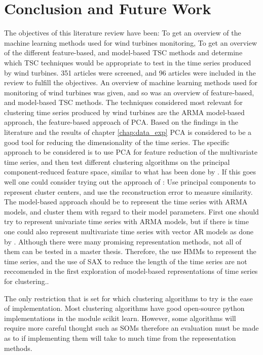 \chapter{Conclusion and Future Work}
The objectives of this literature review have been: To get an overview of the machine learning methods used for wind turbines monitoring, To get an overview of the different feature-based, and model-based TSC methods and determine which TSC techniques would be appropriate to test in the time series produced by wind turbines. 351 articles were screened, and 96 articles were included in the review to fulfill the objectives. An overview of machine learning methods used for monitoring of wind turbines was given, and so was an overview of feature-based, and model-based TSC methods. The techniques considered most relevant for clustering time series produced by wind turbines are the ARMA model-based approach, the feature-based approach of PCA. 
Based on the findings in the literature and the results of chapter \ref{chap:data_exp} 
PCA is considered to be a good tool for reducing the dimensionality of the time series. The specific approach to be considered is to use PCA for feature reduction of the multivariate time series, and then test different clustering algorithms on the principal component-reduced feature space, 
similar to what has been done by \textcite{fault_detect_PARAFAC_k_means}. 
If this goes well one could consider trying out the approach of \textcite{multivariate_tsc_common_pca}: Use principal components to represent cluster centers, and use the reconstruction error to measure similarity.
The model-based approach should be to represent the time series with ARMA models, and cluster them with regard to their model parameters. First one should try to represent univariate time series with ARMA models, but if there is time one could also represent multivariate time series with vector AR models as done by \textcite{var_multivar_tsc}.
Although there were many promising representation methods, not all of them can be tested in a master thesis. 
Therefore, the use  HMMs to represent the time series, and the use of SAX to reduce the length of the time series are not reccomended in the first exploration of model-based representations of time series for clustering.. \bigskip

The only restriction that is set for which clustering algorithms to try is the ease of implementation. Most clustering algorithms have good open-source python implementations in the module scikit learn. However, some algorithms will require more careful thought such as SOMs therefore an evaluation must be made as to if implementing them will take to much time from the representation methods.
